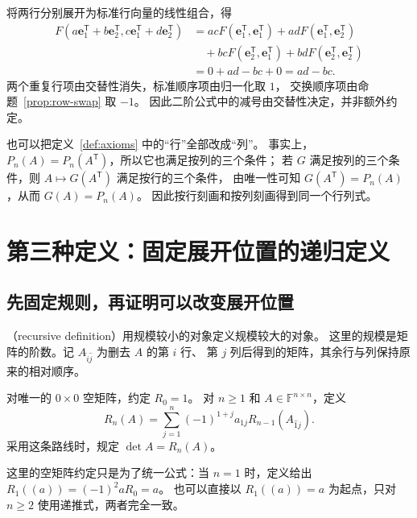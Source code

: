 \documentclass[UTF8,12pt,a4paper,fontset=fandol]{ctexart}
\begin{document}
\begin{solve}
将两行分别展开为标准行向量的线性组合，得
\begin{align*}
  F(a\mathbf e_1^{\mathsf T}+b\mathbf e_2^{\mathsf T},
    c\mathbf e_1^{\mathsf T}+d\mathbf e_2^{\mathsf T})
  &=acF(\mathbf e_1^{\mathsf T},\mathbf e_1^{\mathsf T})
    +adF(\mathbf e_1^{\mathsf T},\mathbf e_2^{\mathsf T})\\
  &\quad+bcF(\mathbf e_2^{\mathsf T},\mathbf e_1^{\mathsf T})
    +bdF(\mathbf e_2^{\mathsf T},\mathbf e_2^{\mathsf T})\\
  &=0+ad-bc+0=ad-bc.
\end{align*}
两个重复行项由交替性消失，标准顺序项由归一化取 $1$，
交换顺序项由命题~\ref{prop:row-swap} 取 $-1$。
因此二阶公式中的减号由交替性决定，并非额外约定。
\end{solve}

也可以把定义~\ref{def:axioms} 中的“行”全部改成“列”。
事实上，$P_n(A)=P_n(A^{\mathsf T})$，所以它也满足按列的三个条件；
若 $G$ 满足按列的三个条件，则 $A\mapsto G(A^{\mathsf T})$ 满足按行的三个条件，
由唯一性可知 $G(A^{\mathsf T})=P_n(A)$，从而 $G(A)=P_n(A)$。
因此按行刻画和按列刻画得到同一个行列式。

\section{第三种定义：固定展开位置的递归定义}
\label{sec:recursive-definition}

\subsection{先固定规则，再证明可以改变展开位置}

（recursive definition）用规模较小的对象定义规模较大的对象。
这里的规模是矩阵的阶数。记 $A_{\widehat i\widehat j}$ 为删去 $A$ 的第 $i$ 行、
第 $j$ 列后得到的矩阵，其余行与列保持原来的相对顺序。

\begin{definition}[按第一行递归定义]
\label{def:recursive-determinant}
对唯一的 $0\times0$ 空矩阵，约定 $R_0=1$。
对 $n\geq1$ 和 $A\in\mathbb F^{n\times n}$，定义
\begin{equation}
  R_n(A)=\sum_{j=1}^{n}(-1)^{1+j}a_{1j}
  R_{n-1}(A_{\widehat1\widehat j}).
  \label{eq:recursive-definition}
\end{equation}
采用这条路线时，规定 $\det A=R_n(A)$。
\end{definition}

这里的空矩阵约定只是为了统一公式：当 $n=1$ 时，定义给出
$R_1((a))=(-1)^2aR_0=a$。
也可以直接以 $R_1((a))=a$ 为起点，只对 $n\geq2$ 使用递推式，两者完全一致。
\end{document}
